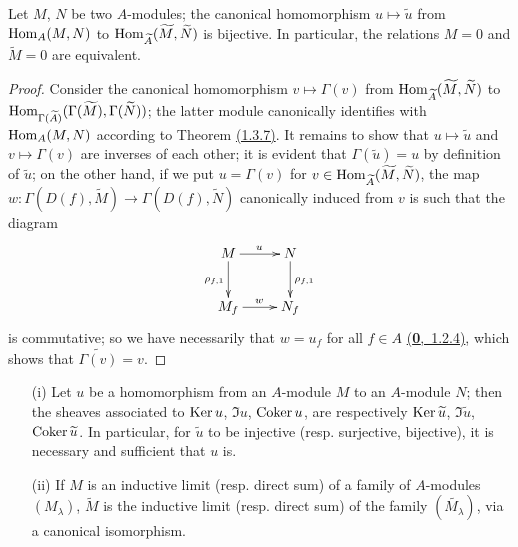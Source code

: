 \begin{cor}[1.3.8]
\label{cor-1.1.3.8}
Let $M$, $N$ be two $A$-modules; the canonical homomorphism $u\mapsto\widetilde{u}$ from
${\mathop{\mathrm{Hom}}\nolimits}_A(M,N)$ to ${\mathop{\mathrm{Hom}}\nolimits}_{\widetilde{A}}(\widetilde{M},\widetilde{N})$ is bijective. In
particular, the relations $M=0$ and $\widetilde{M}=0$ are equivalent.
\end{cor}

\begin{proof}
\label{proof-cor-1.1.3.8}
Consider the canonical homomorphism $v\mapsto\Gamma(v)$ from
${\mathop{\mathrm{Hom}}\nolimits}_{\widetilde{A}}(\widetilde{M},\widetilde{N})$ to
${\mathop{\mathrm{Hom}}\nolimits}_{\Gamma(\widetilde{A})}(\Gamma(\widetilde{M}),\Gamma(\widetilde{N}))$; the latter
module canonically identifies with ${\mathop{\mathrm{Hom}}\nolimits}_A(M,N)$ according to Theorem \hyperref[thm-1.1.3.7]{(1.3.7)}.
It remains to show that $u\mapsto\widetilde{u}$ and $v\mapsto\Gamma(v)$ are inverses of each
other; it is evident that $\Gamma(\widetilde{u})=u$ by definition of $\widetilde{u}$; on the
other hand, if we put $u=\Gamma(v)$ for
$v\in{\mathop{\mathrm{Hom}}\nolimits}_{\widetilde{A}}(\widetilde{M},\widetilde{N})$, the map
$w:\Gamma(D(f),\widetilde{M})\to\Gamma(D(f),\widetilde{N})$ canonically induced from $v$
is such that the diagram
\[
  \xymatrix{
    M\ar[r]^u\ar[d]_{\rho_{f,1}} & N\ar[d]^{\rho_{f,1}}\\
    M_f\ar[r]^w & N_f
  }
\]
is commutative; so we have necessarily that $w=u_f$ for all $f\in A$ \hyperref[env-0.1.2.4]{(\textbf{0},~1.2.4)},
which shows that $\widetilde{\Gamma(v)}=v$.
\end{proof}

\begin{cor}[1.3.9]
\label{cor-1.1.3.9}
\medskip\noindent
\begin{itemize}
  \item[{\rm(i)}] Let $u$ be a homomorphism from an $A$-module $M$ to an $A$-module $N$; then the
        sheaves associated to ${\mathop{\mathrm{Ker}}\nolimits}\, u$, $\Im u$, ${\mathop{\mathrm{Coker}}\nolimits}\, u$, are respectively
        ${\mathop{\mathrm{Ker}}\nolimits}\,\widetilde{u}$, $\Im\widetilde{u}$, ${\mathop{\mathrm{Coker}}\nolimits}\,\widetilde{u}$. In particular, for
        $\widetilde{u}$ to be injective (resp. surjective, bijective), it is necessary and
        sufficient that $u$ is.
  \item[{\rm(ii)}] If $M$ is an inductive limit (resp. direct sum) of a family of $A$-modules
        $(M_\lambda)$, $\widetilde{M}$ is the inductive limit (resp. direct sum) of the
        family $(\widetilde{M_\lambda})$, via a canonical isomorphism.
\end{itemize}
\end{cor}

